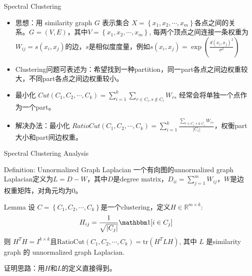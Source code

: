 \begin{frame}{Spectral Clustering}
    \begin{itemize}
        \item 思想：用 similarity graph $G$ 表示集合 $X = \left\{ x_1, x_2, \cdots, x_m \right\}$各点之间的关系。$G=(V, E)$，其中$V=\left\{ x_1, x_2, \cdots, x_m \right\} $, 每两个顶点之间连接一条权重为$W_{ij} = s(x_i, x_j)$的边，$s$是相似度度量，例如$s(x_i, x_j) = \exp\left( \frac{d(x_i, x_j)^{2}}{\sigma^{2}} \right) $
        \item Clustering问题可表述为：希望找到一种partition，同一part各点之间边权重较大，不同part各点之间边权重较小。
        \item 最小化 $Cut(C_1, C_2, \cdots, C_k) = \sum_{i=1}^{k} \sum_{r \in C_i, s \notin C_i} W_{rs}$ 经常会将单独一个点作为一个part。
        \item 解决办法：最小化 $RatioCut(C_1, C_2, \cdots, C_k) = \sum_{i=1}^{k} \frac{\sum_{r \in C_i, s \notin C_i} W_{rs}}{|C_i|}$，权衡part大小和part间边权重。
    \end{itemize}
\end{frame}

\begin{frame}{Spectral Clustering Analysis}
    \begin{block}{Definition: Unnormalized Graph Laplacian}
        一个有向图的unnormalized graph Laplacian定义为$L = D - W$，其中$D$是degree matrix，$D_{ii} = \sum_{j=1}^{m} W_{ij}$，$W$是边权重矩阵，对角元均为$0$。
    \end{block}
    \begin{block}{Lemma}
        设 $C = \left\{ C_1, C_2, \cdots, C_k \right\} $是一个clustering，定义$H \in \mathbb{R}^{m\times k}$:
        \[
            H_{ij} = \frac{1}{\sqrt{|C_j|}} \mathbbm 1[i \in C_j]
        \]
        则 $H^{T}H = I^{k\times k}$且$\text{RatioCut}(C_1, C_2, \cdots, C_k) = \text{tr}(H^{T}LH)$, 其中 $L$ 是similarity graph 的 unnormalized graph Laplacian.
    \end{block}
    证明思路：用$H$和$L$的定义直接得到。
\end{frame}

